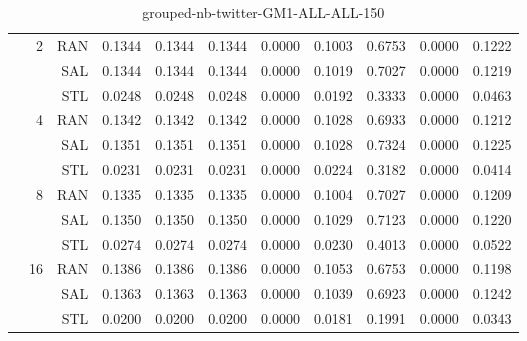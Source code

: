 \begin{center}
\begin{table}[htbp]
\begin{center}
\begin{tabular}{ | r | r | r | r | r | r | r | r | r | r | r |}
 & \multirow{3}{*}{2} & RAN & 0.1344 & 0.1344 & 0.1344 & 0.0000 & 0.1003 & 0.6753 & 0.0000 & 0.1222\\ \cline{3-11}
 &   & SAL & 0.1344 & 0.1344 & 0.1344 & 0.0000 & 0.1019 & 0.7027 & 0.0000 & 0.1219\\ \cline{3-11}
 &   & STL & 0.0248 & 0.0248 & 0.0248 & 0.0000 & 0.0192 & 0.3333 & 0.0000 & 0.0463\\ \cline{2-11}
 & \multirow{3}{*}{4} & RAN & 0.1342 & 0.1342 & 0.1342 & 0.0000 & 0.1028 & 0.6933 & 0.0000 & 0.1212\\ \cline{3-11}
 &   & SAL & 0.1351 & 0.1351 & 0.1351 & 0.0000 & 0.1028 & 0.7324 & 0.0000 & 0.1225\\ \cline{3-11}
 &   & STL & 0.0231 & 0.0231 & 0.0231 & 0.0000 & 0.0224 & 0.3182 & 0.0000 & 0.0414\\ \cline{2-11}
 & \multirow{3}{*}{8} & RAN & 0.1335 & 0.1335 & 0.1335 & 0.0000 & 0.1004 & 0.7027 & 0.0000 & 0.1209\\ \cline{3-11}
 &   & SAL & 0.1350 & 0.1350 & 0.1350 & 0.0000 & 0.1029 & 0.7123 & 0.0000 & 0.1220\\ \cline{3-11}
 &   & STL & 0.0274 & 0.0274 & 0.0274 & 0.0000 & 0.0230 & 0.4013 & 0.0000 & 0.0522\\ \cline{2-11}
 & \multirow{3}{*}{16} & RAN & 0.1386 & 0.1386 & 0.1386 & 0.0000 & 0.1053 & 0.6753 & 0.0000 & 0.1198\\ \cline{3-11}
 &   & SAL & 0.1363 & 0.1363 & 0.1363 & 0.0000 & 0.1039 & 0.6923 & 0.0000 & 0.1242\\ \cline{3-11}
 &   & STL & 0.0200 & 0.0200 & 0.0200 & 0.0000 & 0.0181 & 0.1991 & 0.0000 & 0.0343\\ \cline{2-11}
\hline
\end{tabular}
\caption{grouped-nb-twitter-GM1-ALL-ALL-150}
\end{center}
 \end{table}
\end{center}

